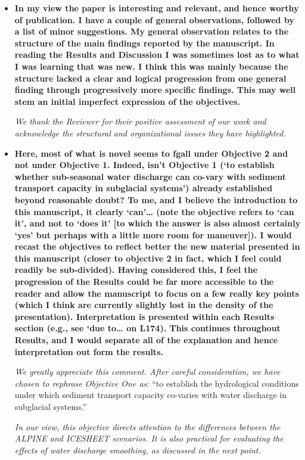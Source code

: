 \documentclass[11pt]{article}
\begin{document}
\begin{itemize}

\item \textbf{In my view the paper is interesting and relevant, and hence worthy of publication. I have a couple
    of general observations, followed by a list of minor suggestions.
    My general observation relates to the structure of the main findings reported by the manuscript.
    In reading the Results and Discussion I was sometimes lost as to what I was learning that was new.
    I think this was mainly because the structure lacked a clear and logical progression from one
    general finding through progressively more specific findings. This may well stem an initial
    imperfect expression of the objectives.}

  \textit{We thank the Reviewer for their positive assessment of our work and acknowledge the structural and organizational issues they have highlighted.}
  
\item  \textbf{Here, most of what is novel seems to fgall under Objective
    2 and not under Objective 1. Indeed, isn’t Objective 1 (‘to establish whether sub-seasonal water
    discharge can co-vary with sediment transport capacity in subglacial systems’) already established
    beyond reasonable doubt? To me, and I believe the introduction to this manuscript, it clearly
    ‘can’… (note the objective refers to ‘can it’, and not to ‘does it’ [to which the answer is also almost
    certainly ‘yes’ but perhaps with a little more room for maneuver]). I would recast the objectives
    to reflect better the new material presented in this manuscript (closer to objective 2 in fact, which
    I feel could readily be sub-divided). Having considered this, I feel the progression of the Results
    could be far more accessible to the reader and allow the manuscript to focus on a few really key
    points (which I think are currently slightly lost in the density of the presentation).
    Interpretation is presented within each Results section (e.g., see ‘due to… on L174). This
    continues throughout Results, and I would separate all of the explanation and hence
    interpretation out form the results.}

  \textit{We greatly appreciate this comment. After careful consideration, we have chosen to rephrase Objective One as:} ``to establish the hydrological conditions under which sediment transport capacity co-varies with water discharge in subglacial systems.'' 

\textit{In our view, this objective directs attention to the differences between the ALPINE and ICESHEET scenarios. It is also practical for evaluating the effects of water discharge smoothing, as discussed in the next point.}


\end{itemize}
\end{document}
